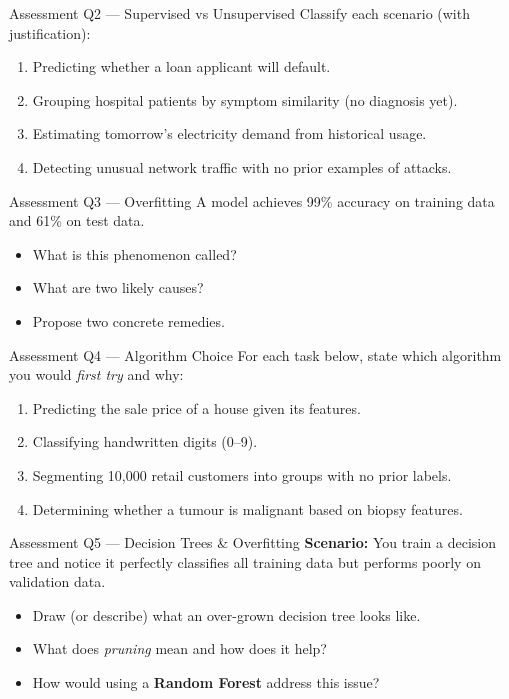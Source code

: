 \documentclass[10pt]{beamer}
\begin{document}
\begin{frame}{Assessment Q2 — Supervised vs Unsupervised}
    Classify each scenario (with justification):
    \begin{enumerate}
        \item Predicting whether a loan applicant will default.
        \item Grouping hospital patients by symptom similarity (no diagnosis yet).
        \item Estimating tomorrow's electricity demand from historical usage.
        \item Detecting unusual network traffic with no prior examples of attacks.
    \end{enumerate}
\end{frame}

\begin{frame}{Assessment Q3 — Overfitting}
    A model achieves 99\% accuracy on training data and 61\% on test data.

    \begin{itemize}
        \item What is this phenomenon called?
        \item What are two likely causes?
        \item Propose two concrete remedies.
    \end{itemize}
\end{frame}

\begin{frame}{Assessment Q4 — Algorithm Choice}
    For each task below, state which algorithm you would \textit{first try} and why:
    \begin{enumerate}
        \item Predicting the sale price of a house given its features.
        \item Classifying handwritten digits (0–9).
        \item Segmenting 10,000 retail customers into groups with no prior labels.
        \item Determining whether a tumour is malignant based on biopsy features.
    \end{enumerate}
\end{frame}

\begin{frame}{Assessment Q5 — Decision Trees \& Overfitting}
    \textbf{Scenario:} You train a decision tree and notice it perfectly classifies all training data but performs poorly on validation data.

    \vspace{0.2cm}
    \begin{itemize}
        \item Draw (or describe) what an over-grown decision tree looks like.
        \item What does \textit{pruning} mean and how does it help?
        \item How would using a \textbf{Random Forest} address this issue?
    \end{itemize}
\end{frame}
\end{document}
